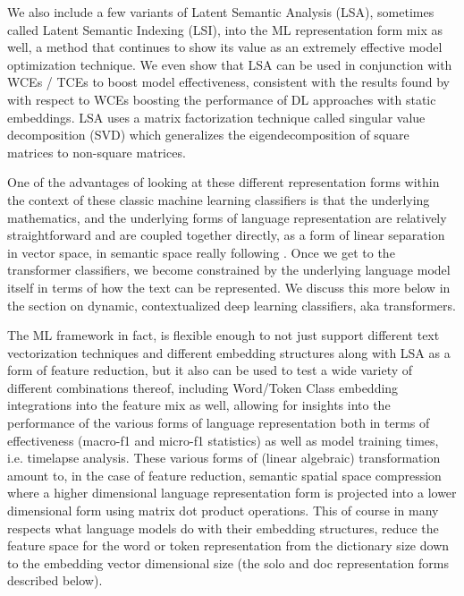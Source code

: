 \documentclass[final]{clv2025}
\begin{document}
We also include a few variants of Latent Semantic Analysis (LSA), sometimes called Latent Semantic Indexing (LSI), \cite{deerwester} into the ML representation form mix as well, a method that continues to show its value as an extremely effective model optimization technique. We even show that LSA can be used in conjunction with WCEs / TCEs to boost model effectiveness, consistent with the results found by \cite{moreo} with respect to WCEs boosting the performance of DL approaches with static embeddings. LSA uses a matrix factorization technique called singular value decomposition (SVD) which generalizes the eigendecomposition of square matrices to non-square matrices. 

One of the advantages of looking at these different representation forms within the context of these classic machine learning classifiers is that the underlying mathematics, and the underlying forms of language representation are relatively straightforward and are coupled together directly, as a form of linear separation in vector space, in semantic space really following \cite{worth}. Once we get to the transformer classifiers, we become constrained by the underlying language model itself in terms of how the text can be represented. We discuss this more below in the section on dynamic, contextualized deep learning classifiers, aka transformers.

The ML framework in fact, is flexible enough to not just support different text vectorization techniques and different embedding structures along with LSA as a form of feature reduction, but it also can be used to test a wide variety of different combinations thereof, including Word/Token Class embedding integrations into the feature mix as well, allowing for insights into the performance of the various forms of language representation both in terms of effectiveness (macro-f1 and micro-f1 statistics) as well as model training times, i.e. timelapse analysis. These various forms of (linear algebraic) transformation amount to, in the case of feature reduction, semantic spatial space compression where a higher dimensional language representation form is projected into a lower dimensional form using matrix dot product operations. This of course in many respects what language models do with their embedding structures, reduce the feature space for the word or token representation from the dictionary size down to the embedding vector dimensional size (the solo and doc representation forms described below).
\end{document}
